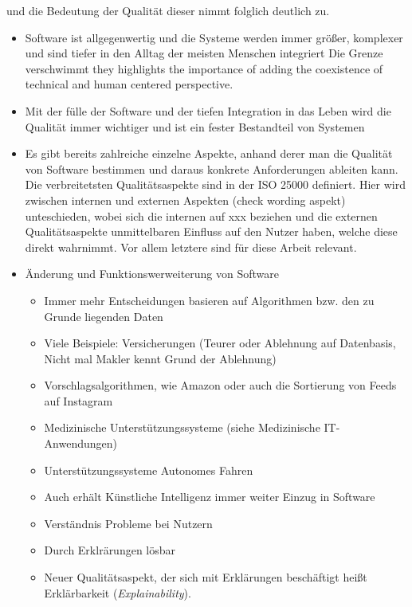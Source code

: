 und die Bedeutung der Qualität dieser nimmt folglich deutlich zu. 

\begin{itemize}
    \item Software ist allgegenwertig und die Systeme werden immer größer, komplexer und sind tiefer in den Alltag der meisten Menschen integriert \cite{carvalho2020developers} Die Grenze verschwimmt \cite{ehsan_human-centered_2020} they highlights the importance of adding the coexistence of technical and human centered perspective.
    \item Mit der fülle der Software und der tiefen Integration in das Leben wird die Qualität immer wichtiger und ist ein fester Bestandteil von Systemen \cite{schneider2012abenteuer}
    \item Es gibt bereits zahlreiche einzelne Aspekte, anhand derer man die Qualität von Software bestimmen und daraus konkrete Anforderungen ableiten kann. Die verbreitetsten Qualitätsaspekte sind in der ISO 25000 definiert. \cite{international2011iso}
    Hier wird zwischen internen und externen Aspekten (check wording aspekt) unteschieden, wobei sich die internen auf xxx beziehen und die externen Qualitätsaspekte unmittelbaren Einfluss auf den Nutzer haben, welche diese direkt wahrnimmt. Vor allem letztere sind für diese Arbeit relevant.
    \item Änderung und Funktionswerweiterung von Software
    \begin{itemize}
        \item Immer mehr Entscheidungen basieren auf Algorithmen bzw. den zu Grunde liegenden Daten
        \item Viele Beispiele: Versicherungen (Teurer oder Ablehnung auf Datenbasis, Nicht mal Makler kennt Grund der Ablehnung)
        \item Vorschlagsalgorithmen, wie Amazon oder auch die Sortierung von Feeds auf Instagram
        \item Medizinische Unterstützungssysteme \cite{doshi2017towards} (siehe Medizinische IT-Anwendungen)
        \item Unterstützungssysteme Autonomes Fahren
        \item Auch erhält Künstliche Intelligenz immer weiter Einzug in Software
        \item Verständnis Probleme bei Nutzern
        \item Durch Erklrärungen lösbar
        \item Neuer Qualitätsaspekt, der sich mit Erklärungen beschäftigt heißt Erklärbarkeit (\textit{Explainability}).

\end{itemize}
\end{itemize}
